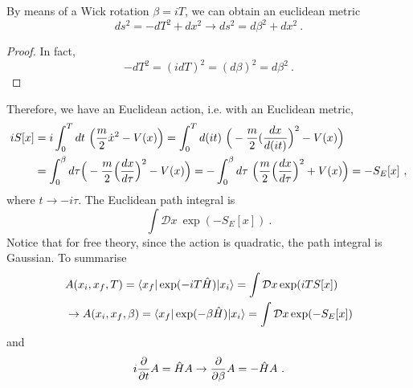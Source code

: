     By means of a Wick rotation $\beta = i T$, we can obtain an euclidean metric 
    \begin{equation*}
        ds^2 = - dT^2 + dx^2 \rightarrow ds^2 = d\beta^2 + dx^2 ~.
    \end{equation*}
    \begin{proof}
        In fact, 
        \begin{equation*}
            - dT^2 = (i dT)^2 = (d\beta)^2 = d \beta^2 ~.
        \end{equation*}
    \end{proof}
    Therefore, we have an Euclidean action, i.e. with an Euclidean metric, 
    \begin{equation*}
    \begin{aligned}
        i S[x] & = i \int_0^T dt ~ \Big ( \frac{m}{2} \dot x^2 - V(x) \Big) = \int_0^T d (i t) ~ \Big ( - \frac{m}{2} (\frac{dx}{d(it)} \Big )^2 - V(x) \Big) \\ & = \int_{0}^{\beta} d \tau \Big (- \frac{m}{2} \Big (\frac{dx}{d\tau} \Big )^2 - V(x) \Big ) = - \int_{0}^{\beta} d\tau ~ \Big (\frac{m}{2} \Big (\frac{dx}{d\tau} \Big )^2 + V(x) \Big ) = - S_E [x] ~,
    \end{aligned}
    \end{equation*}
    where $ t \rightarrow - i \tau$. The Euclidean path integral is 
    \begin{equation*}
        \int \mathcal D x ~ \exp(- S_E [x]) ~.
    \end{equation*}
    Notice that for free theory, since the action is quadratic, the path integral is Gaussian. To summarise 
    \begin{equation*}
    \begin{aligned}
        & A(x_i, x_f, T) = \langle x_f\vert \exp(- i T \hat H) \vert x_i\rangle = \int \mathcal D x \exp(i T S[x]) \\ & \rightarrow A(x_i, x_f, \beta) = \langle x_f\vert \exp(- \beta \hat H) \vert x_i\rangle = \int \mathcal D x \exp(- S_E [x]) 
    \end{aligned}
    \end{equation*}
    and 
    \begin{equation*}
        i \frac{\partial}{\partial t} A = \hat H A \rightarrow \frac{\partial}{\partial\beta} A = - \hat H A ~.
    \end{equation*}

